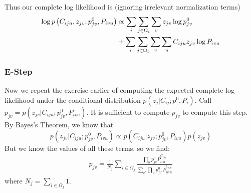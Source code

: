 \documentclass[useAMS,usenatbib,a4paper]{mn2e}
\def\indic#1{\mathbb{I}\left({#1}\right)}
\begin{document}
Thus our complete log likelihood is (ignoring irrelevant normalization terms)
\begin{align}
  \log p \left( C_{iju}, z_{jv}; p_{jv}^0, P_{ivu} \right) &\propto \sum_{i} \sum_{j \in
\Omega_i} \sum_{v} z_{jv} \log p_{jv}^0
  \notag\\
  &+ \sum_{i} \sum_{j \in \Omega_i} \sum_{v} \sum_{u} C_{iju} z_{jv} \log P_{ivu}
\end{align}

\subsubsection{E-Step}

Now we repeat the exercise earlier of computing the expected complete log
likelihood under the conditional distribution $p(z_{j} | C_{ij}; p^0,
P_{i})$. Call $p_{jv} = p(z_{jv} | C_{iju}; p^0_{jv}, P_{ivu})$. It is
sufficient to compute $p_{jv}$ to compute this step. By Bayes's Theorem, we
know that
$$
p(z_{jv} | C_{iju}; p^0_{jv}, P_{ivu}) \propto p(C_{iju} | z_{jv}; p^0_{jv},
P_{ivu}) p(z_{jv})
$$
But we know the values of all these terms, so we find:
\begin{align}
  p_{jv} = \frac{1}{N_j} \sum_{i \in \Omega_j} \frac{\prod_u p^0_{jv}
  P_{ivu}^{C_{iju}}}{\sum_{v'} \prod_u p^0_{jv'} P_{iv'u}^{C_{iju}}}
\end{align}
where $N_j = \sum_{i \in \Omega_j} 1$.
\end{document}

